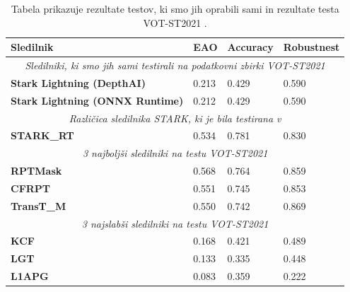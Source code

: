 \documentclass[a4paper,12pt,openright]{book}
\begin{document}
\begin{table}[htb]
    \begin{tabular}{p{}|p{}|p{}|p{}}    %
        {\bf Sledilnik }                               & {\bf EAO} & {\bf Accuracy} & {\bf Robustnest}   \\
        \hline
        \multicolumn{4}{c}{\emph{Sledilniki, ki smo jih sami testirali na podatkovni zbirki VOT-ST2021}} \\
        \hline
        \bf Stark Lightning \scriptsize (DepthAI)      & 0.213     & 0.429          & 0.590              \\
        \bf Stark Lightning \scriptsize (ONNX Runtime) & 0.212     & 0.429          & 0.590              \\
        \hline
        \multicolumn{4}{c}{\emph{Različica sledilnika STARK, ki je bila testirana v \cite{vot2021}}}     \\
        \hline
        \bf STARK\_RT                                  & 0.534     & 0.781          & 0.830              \\
        \hline
        \multicolumn{4}{c}{\emph{3 najboljši sledilniki na testu VOT-ST2021 \cite{vot2021}}}             \\
        \hline
        \bf RPTMask                                    & 0.568     & 0.764          & 0.859              \\
        \bf CFRPT                                      & 0.551     & 0.745          & 0.853              \\
        \bf TransT\_M                                  & 0.550     & 0.742          & 0.869              \\
        \hline
        \multicolumn{4}{c}{\emph{3 najslabši sledilniki na testu VOT-ST2021 \cite{vot2021}}}             \\
        \hline
        \bf KCF                                        & 0.168     & 0.421          & 0.489              \\
        \bf LGT                                        & 0.133     & 0.335          & 0.448              \\
        \bf L1APG                                      & 0.083     & 0.359          & 0.222              \\
    \end{tabular}
    \caption{Tabela prikazuje rezultate testov, ki smo jih oprabili sami in rezultate testa VOT-ST2021 \cite{vot2021}.}
    \label{tab:vot_res}
\end{table}
\end{document}
